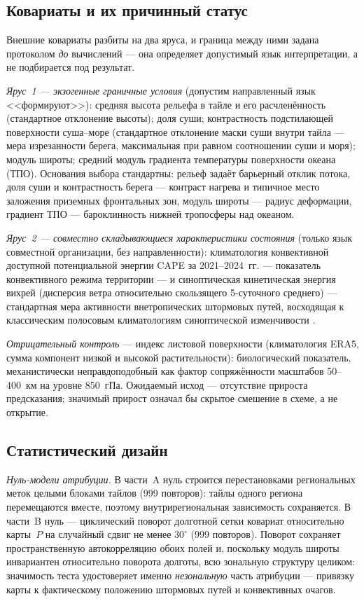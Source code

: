 \documentclass[11pt,a4paper]{article}
\begin{document}
\subsection{Ковариаты и их причинный статус}

Внешние ковариаты разбиты на два яруса, и граница между ними задана протоколом \emph{до} вычислений --- она определяет допустимый язык интерпретации, а не подбирается под результат.

\emph{Ярус~1 --- экзогенные граничные условия} (допустим направленный язык <<формируют>>): средняя высота рельефа в тайле и его расчленённость (стандартное отклонение высоты); доля суши; контрастность подстилающей поверхности суша--море (стандартное отклонение маски суши внутри тайла --- мера изрезанности берега, максимальная при равном соотношении суши и моря); модуль широты; средний модуль градиента температуры поверхности океана (ТПО). Основания выбора стандартны: рельеф задаёт барьерный отклик потока, доля суши и контрастность берега --- контраст нагрева и типичное место заложения приземных фронтальных зон, модуль широты --- радиус деформации, градиент ТПО --- бароклинность нижней тропосферы над океаном.

\emph{Ярус~2 --- совместно складывающиеся характеристики состояния} (только язык совместной организации, без направленности): климатология конвективной доступной потенциальной энергии CAPE за 2021--2024~гг. \cite{RiemannCampe2009} --- показатель конвективного режима территории --- и синоптическая кинетическая энергия вихрей (дисперсия ветра относительно скользящего 5-суточного среднего) --- стандартная мера активности внетропических штормовых путей, восходящая к классическим полосовым климатологиям синоптической изменчивости \cite{Blackmon1976,HoskinsHodges2005,HoskinsHodges2019}.

\emph{Отрицательный контроль} --- индекс листовой поверхности (климатология ERA5, сумма компонент низкой и высокой растительности): биологический показатель, механистически неправдоподобный как фактор сопряжённости масштабов 50--400~км на уровне 850~гПа. Ожидаемый исход --- отсутствие прироста предсказания; значимый прирост означал бы скрытое смешение в схеме, а не открытие.

\subsection{Статистический дизайн}

\emph{Нуль-модели атрибуции.} В части~A нуль строится перестановками региональных меток целыми блоками тайлов (999 повторов): тайлы одного региона перемещаются вместе, поэтому внутрирегиональная зависимость сохраняется. В части~B нуль --- циклический поворот долготной сетки ковариат относительно карты~$P$ на случайный сдвиг не менее $30^\circ$ (999 повторов). Поворот сохраняет пространственную автокорреляцию обоих полей и, поскольку модуль широты инвариантен относительно поворота долготы, всю зональную структуру целиком: значимость теста удостоверяет именно \emph{незональную} часть атрибуции --- привязку карты к фактическому положению штормовых путей и конвективных очагов.
\end{document}
